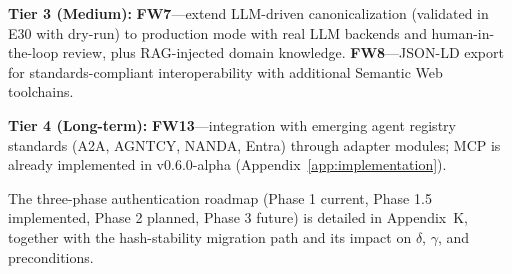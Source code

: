 \textbf{Tier 3 (Medium):} \textbf{FW7}---extend LLM-driven canonicalization (validated in E30 with dry-run) to production mode with real LLM backends and human-in-the-loop review, plus RAG-injected domain knowledge. \textbf{FW8}---JSON-LD export for standards-compliant interoperability with additional Semantic Web toolchains.

\textbf{Tier 4 (Long-term):} \textbf{FW13}---integration with emerging agent registry standards (A2A, AGNTCY, NANDA, Entra) through adapter modules; MCP is already implemented in v0.6.0-alpha (Appendix~\ref{app:implementation}).

The three-phase authentication roadmap (Phase 1 current, Phase 1.5 implemented, Phase 2 planned, Phase 3 future) is detailed in Appendix~K, together with the hash-stability migration path and its impact on $\delta$, $\gamma$, and preconditions.
